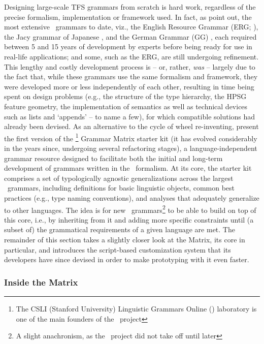 Designing large-scale TFS grammars from scratch is hard work, regardless of the
precise formalism, implementation or framework used. In fact, as
\citet{Ben:Fli:Oep:02} point out, the most extensive \delphin\ grammars to
date, viz., the English Resource Grammar (ERG; \citep{copestake2000open}),
the Jacy grammar of Japanese \citep{siegel2002efficient}, and the German
Grammar (GG) \citep{muller2000hpsg}, each required between 5 and 15 years of
development by experts before being ready for use in real-life applications;
and some, such as the ERG, are still undergoing refinement. This lengthy and
costly development process is -- or, rather, \emph{was} -- largely due to the
fact that, while these grammars use the same formalism and framework, they were
developed more or less independently of each other, resulting in time being
spent on design problems (e.g., the structure of the type hierarchy, the HPSG
feature geometry, the implementation of semantics as well as technical devices
such as lists and `appends' -- to name a few), for which compatible solutions
had already been devised. As an alternative to the cycle of wheel re-inventing,
\citet{Ben:Fli:Oep:02} present the first version of the \lingo\footnote{The
CSLI (Stanford  University) Linguistic Grammars Online (\lingo) laboratory is
one of the main founders of the \delphin\ project} Grammar Matrix starter kit
(it has evolved considerably in the years since, undergoing several refactoring
stages), a language-independent grammar resource designed to facilitate both
the initial and long-term development of grammars written in the \delphin\
formalism. At its core, the starter kit comprises a set of typologically
agnostic generalizations across the largest \delphin\ grammars, including
definitions for basic linguistic objects, common best practices (e.g., type
naming conventions), and analyses that adequately generalize to other
languages. The idea is for new \delphin\ grammars\footnote{A slight
anachronism, as the \delphin\ project did not take off until later} to be able
to build on top of this core, i.e.,  by inheriting from it and adding more
specific constraints until (a subset of) the grammatical requirements of a
given language are met. The remainder of this section takes a slightly closer
look at the Matrix, its core in particular, and introduces the script-based
customization system that its developers have since devised in order to make
prototyping with it even faster.

\subsubsection{Inside the Matrix}
\label{ssub:matrixcore}

